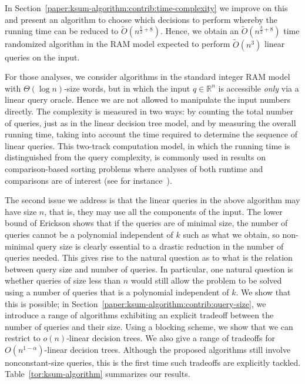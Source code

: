 In Section~\ref{paper:ksum-algorithm:contrib:time-complexity} we improve on this and present an
algorithm to choose which decisions to perform whereby the running time can be
reduced to $\tilde{O}(n^{\frac{k}{2}+8})$. Hence, we obtain an
$\tilde{O}(n^{\frac{k}{2}+8})$ time randomized algorithm in the RAM model
expected to perform $\tilde{O}(n^3)$ linear queries on the input.
%


For those analyses, we consider algorithms in the standard integer RAM model with
$\Theta(\log n)$-size words, but in which the input $q\in\mathbb{R}^n$ is
accessible \emph{only} via a linear query oracle. Hence we are not allowed to
manipulate the input numbers directly. The complexity is measured in two ways:
by counting the total number of queries, just as in the linear decision tree
model, and by measuring the overall running time, taking into account the time
required to determine the sequence of linear queries. This two-track
computation model, in which the running time is distinguished from the query
complexity, is commonly used in results on comparison-based sorting problems
where analyses of both runtime and comparisons are of interest (see for
instance~\cite{SS95,CFJJM10,CFJJM13}).

The second issue we address is that the linear queries in the above algorithm may
have size $n$, that is, they may use all the components of the input.
The lower bound of Erickson shows that if the queries are of minimal size, the number
of queries cannot be a polynomial independent of $k$ such as what we obtain, so
non-minimal query size is clearly essential to a drastic reduction in the number of queries needed.
This gives rise to the natural question as to what is the relation between query size and number of queries.
In particular, one natural question is whether queries of size less than $n$
would still allow the problem to be solved using a number of queries that is a
polynomial independent of $k$. We show that this is possible; in Section~\ref{paper:ksum-algorithm:contrib:query-size},
we introduce a range of
algorithms exhibiting an explicit tradeoff between the number of queries and
their size. Using a blocking scheme, we show that we can restrict to
$o(n)$-linear decision trees. We also give a
range of tradeoffs for $O(n^{1-\alpha})$-linear decision trees. Although the
proposed algorithms still involve nonconstant-size queries, this is
the first time such tradeoffs are explicitly tackled. Table~\ref{tor:ksum-algorithm} summarizes our results.


